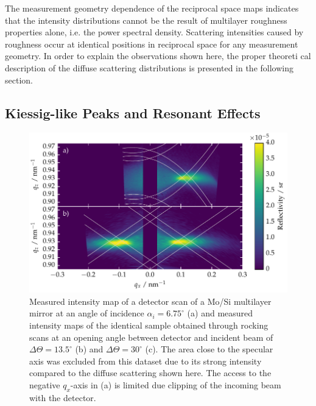 The measurement geometry dependence of the reciprocal space maps indicates that the intensity distributions cannot be the result of multilayer roughness properties alone, i.e. the power spectral density. Scattering intensities caused by roughness occur at identical positions in reciprocal space for any measurement geometry. In order to explain the observations shown here, the proper theoreti
cal description of the diffuse scattering distributions is presented in the following section.

\subsection{Kiessig-like Peaks and Resonant Effects}
\begin{figure}[htbp]
        \includegraphics[width=\textwidth]{img/kiessig_like_peaks_diffuse_map} \caption{Measured intensity map of a detector scan of a Mo/Si multilayer mirror at an angle of incidence $\alpha_i = 6.75^\circ$ (a) and  measured intensity maps of the identical sample obtained through rocking scans at an opening angle between detector and incident beam of $\Delta \Theta = 13.5^\circ$ (b) and $\Delta \Theta = 30^\circ$ (c). The area close to the specular axis was excluded from this dataset due to its strong intensity compared to the diffuse scattering shown here. The access to the negative $q_x$-axis in (a) is limited due clipping of the incoming beam with the detector.} \label{fig:comparison} 
\end{figure}
